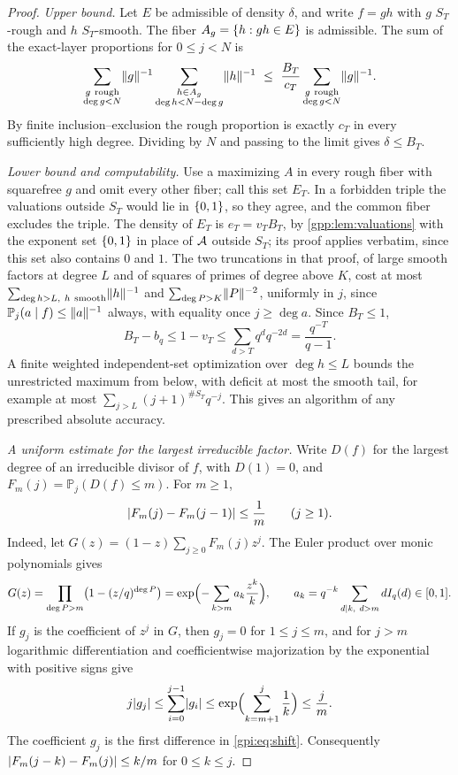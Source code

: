\begin{proof}
\emph{Upper bound.} Let $E$ be admissible of density $\delta$, and write $f=gh$ with $g$
$S_T$-rough and $h$ $S_T$-smooth. The fiber $A_g=\{h:gh\in E\}$ is admissible. The sum of
the exact-layer proportions for $0\le j<N$ is
\[
 \sum_{\substack{g\ \mathrm{rough}\\ \deg g<N}}\lVert g\rVert^{-1}
 \sum_{\substack{h\in A_g\\ \deg h<N-\deg g}}\lVert h\rVert^{-1}
 \ \le\ \frac{B_T}{c_T}\sum_{\substack{g\ \mathrm{rough}\\ \deg g<N}}\lVert g\rVert^{-1}.
\]
By finite inclusion--exclusion the rough proportion is exactly $c_T$ in every sufficiently
high degree. Dividing by $N$ and passing to the limit gives $\delta\le B_T$.

\emph{Lower bound and computability.} Use a maximizing $A$ in every rough fiber with
squarefree $g$ and omit every other fiber; call this set $E_T$. In a forbidden triple the
valuations outside $S_T$ would lie in $\{0,1\}$, so they agree, and the common fiber
excludes the triple. The density of $E_T$ is $e_T=v_TB_T$, by \cref{gpp:lem:valuations}
with the exponent set $\{0,1\}$ in place of $\mathcal{A}$ outside $S_T$; its proof applies
verbatim, since this set also contains $0$ and $1$. The two truncations in that proof, of
large smooth factors at degree $L$ and of squares of primes of degree above $K$, cost at most
$\sum_{\deg h>L,\ h\ \mathrm{smooth}}\norm h^{-1}$ and $\sum_{\deg P>K}\lVert P\rVert^{-2}$,
uniformly in $j$, since $\mathbb P_j(a\mid f)\le\lVert a\rVert^{-1}$ always, with equality once
$j\ge\deg a$. Since $B_T\le1$,
\[
 B_T-b_q\le1-v_T\le\sum_{d>T}q^dq^{-2d}=\frac{q^{-T}}{q-1}.
\]
A finite weighted independent-set optimization over $\deg h\le L$ bounds the unrestricted
maximum from below, with deficit at most the smooth tail, for example at most
$\sum_{j>L}(j+1)^{\#S_T}q^{-j}$. This gives an algorithm of any prescribed absolute accuracy.

\emph{A uniform estimate for the largest irreducible factor.} Write $D(f)$ for the largest
degree of an irreducible divisor of $f$, with $D(1)=0$, and $F_m(j)=\mathbb P_j(D(f)\le m)$.
For $m\ge1$,
\begin{equation}\label{gpi:eq:shift}
 \lvert F_m(j)-F_m(j-1)\rvert\le\frac1m\qquad(j\ge1).
\end{equation}
Indeed, let $G(z)=(1-z)\sum_{j\ge0}F_m(j)z^j$. The Euler product over monic polynomials gives
\[
 G(z)=\prod_{\deg P>m}\bigl(1-(z/q)^{\deg P}\bigr)
 =\exp\Bigl(-\sum_{k>m}a_k\frac{z^k}k\Bigr),\qquad
 a_k=q^{-k}\sum_{d\mid k,\ d>m}dI_q(d)\in[0,1].
\]
If $g_j$ is the coefficient of $z^j$ in $G$, then $g_j=0$ for $1\le j\le m$, and for $j>m$
logarithmic differentiation and coefficientwise majorization by the exponential with positive
signs give
\[
 j\lvert g_j\rvert\le\sum_{i=0}^{j-1}\lvert g_i\rvert\le\exp\Bigl(\sum_{k=m+1}^{j}\frac1k\Bigr)\le\frac jm .
\]
The coefficient $g_j$ is the first difference in \eqref{gpi:eq:shift}. Consequently
$\lvert F_m(j-k)-F_m(j)\rvert\le k/m$ for $0\le k\le j$.


\end{proof}
